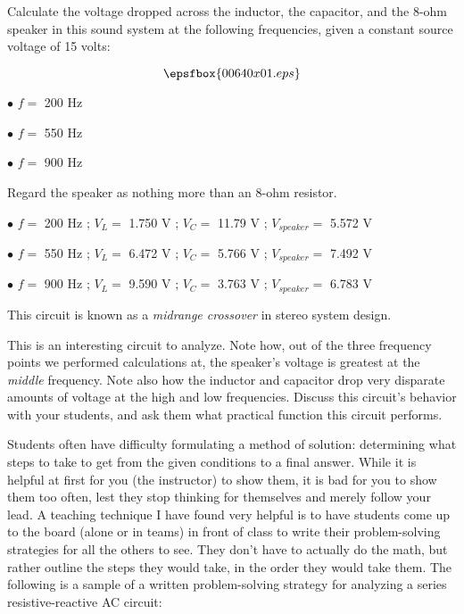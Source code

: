 

Calculate the voltage dropped across the inductor, the capacitor, and the 8-ohm speaker in this sound system at the following frequencies, given a constant source voltage of 15 volts:

$$\epsfbox{00640x01.eps}$$

\medskip
\item{$\bullet$} $f =$ 200 Hz 
\item{$\bullet$} $f =$ 550 Hz 
\item{$\bullet$} $f =$ 900 Hz 
\medskip

Regard the speaker as nothing more than an 8-ohm resistor.







\medskip
\item{$\bullet$} $f =$ 200 Hz ; $V_L =$ 1.750 V ; $V_C =$ 11.79 V ; $V_{speaker} =$ 5.572 V  
\item{$\bullet$} $f =$ 550 Hz ; $V_L =$ 6.472 V ; $V_C =$ 5.766 V ; $V_{speaker} =$ 7.492 V 
\item{$\bullet$} $f =$ 900 Hz ; $V_L =$ 9.590 V ; $V_C =$ 3.763 V ; $V_{speaker} =$ 6.783 V
\medskip

This circuit is known as a {\it midrange crossover} in stereo system design.







This is an interesting circuit to analyze.  Note how, out of the three frequency points we performed calculations at, the speaker's voltage is greatest at the {\it middle} frequency.  Note also how the inductor and capacitor drop very disparate amounts of voltage at the high and low frequencies.  Discuss this circuit's behavior with your students, and ask them what practical function this circuit performs.

\vskip 10pt

Students often have difficulty formulating a method of solution: determining what steps to take to get from the given conditions to a final answer.  While it is helpful at first for you (the instructor) to show them, it is bad for you to show them too often, lest they stop thinking for themselves and merely follow your lead.  A teaching technique I have found very helpful is to have students come up to the board (alone or in teams) in front of class to write their problem-solving strategies for all the others to see.  They don't have to actually do the math, but rather outline the steps they would take, in the order they would take them.  The following is a sample of a written problem-solving strategy for analyzing a series resistive-reactive AC circuit:

